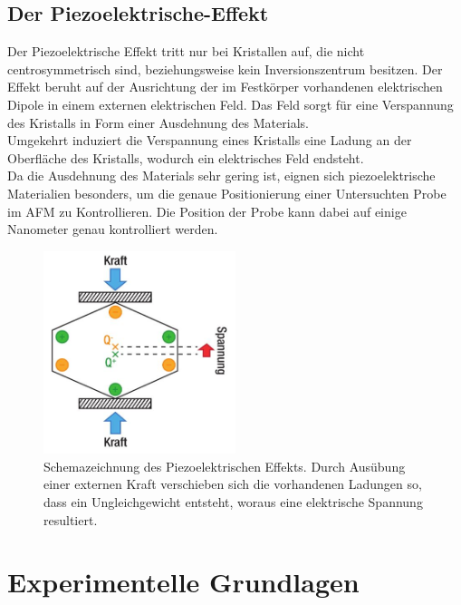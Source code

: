 \subsection{Der Piezoelektrische-Effekt}
Der Piezoelektrische Effekt tritt nur bei Kristallen auf, die nicht centrosymmetrisch sind, beziehungsweise kein Inversionszentrum besitzen. Der Effekt beruht auf der Ausrichtung der im Festkörper vorhandenen elektrischen Dipole in einem externen elektrischen Feld. Das Feld sorgt für eine Verspannung des Kristalls in Form einer Ausdehnung des Materials.\\
Umgekehrt induziert die Verspannung eines Kristalls eine Ladung an der Oberfläche des Kristalls, wodurch ein elektrisches Feld endsteht.\\
Da die Ausdehnung des Materials sehr gering ist, eignen sich piezoelektrische Materialien besonders, um die genaue Positionierung einer Untersuchten Probe im AFM zu Kontrollieren. Die Position der Probe kann dabei auf einige Nanometer genau kontrolliert werden.
\begin{figure}
  \centering
  \includegraphics[width=0.5\textwidth]{content/Piezo.jpg}
  \caption{Schemazeichnung des Piezoelektrischen Effekts. Durch Ausübung einer externen Kraft verschieben sich die vorhandenen Ladungen so, dass ein Ungleichgewicht entsteht, woraus eine elektrische Spannung resultiert.\cite{Thorlabs}}
  \label{fig:piezo}
\end{figure}
%
\section{Experimentelle Grundlagen}
